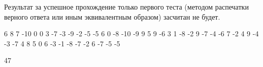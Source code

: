 Результат за успешное прохождение только первого теста (методом распечатки верного ответа или иным эквивалентным образом) засчитан не будет.


\begin{myverbbox}[\small]{\vinput}
    6 8 7
    -10	0	0	3	-7	-3	-9	-2
    -5	-5	6	0	-8	-10	-9	9
    5	9	-6	3	1	-8	-2	9
    -7	-4	-6	7	-2	4	9	-4
    -3	-7	4	8	5	0	6	-3
    -1	-8	-7	-2	6	-7	-5	-5
\end{myverbbox}

\begin{myverbbox}[\small]{\voutput}
    47	
\end{myverbbox}


